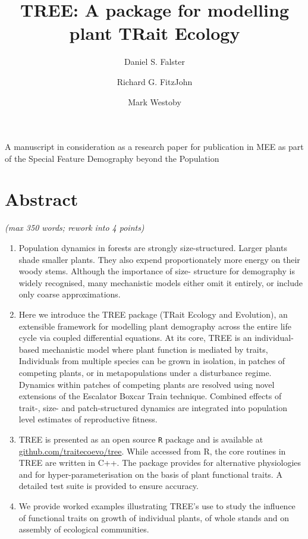\documentclass[]{article}
\title{TREE: A package for modelling plant TRait Ecology}
\author[1]{Daniel S. Falster}
\author[1]{Richard G. FitzJohn}
\author[1]{Mark Westoby}
\affil[1]{Dept of Biological Sciences, Macquarie University, Sydney, NSW 2109, Australia}
\date{}
\begin{document}
\maketitle

A manuscript in consideration as a research paper for publication in MEE
as part of the Special Feature Demography beyond the Population

\listoftodos

\linenumbers

\section{Abstract}\label{abstract}

\emph{(max 350 words; rework into 4 points)}

\begin{enumerate}
\def\labelenumi{\arabic{enumi}.}
\itemsep1pt\parskip0pt
\item
  Population dynamics in forests are strongly size-structured. Larger
  plants shade smaller plants. They also expend proportionately more
  energy on their woody stems. Although the importance of size-
  structure for demography is widely recognised, many mechanistic models
  either omit it entirely, or include only coarse approximations.
\item
  Here we introduce the TREE package (TRait Ecology and Evolution), an
  extensible framework for modelling plant demography across the entire
  life cycle via coupled differential equations. At its core, TREE is an
  individual-based mechanistic model where plant function is mediated by
  traits, Individuals from multiple species can be grown in isolation,
  in patches of competing plants, or in metapopulations under a
  disturbance regime. Dynamics within patches of competing plants are
  resolved using novel extensions of the Escalator Boxcar Train
  technique. Combined effects of trait-, size- and patch-structured
  dynamics are integrated into population level estimates of
  reproductive fitness.
\item
  TREE is presented as an open source \texttt{R} package and is
  available at
  \href{https://github.com/traitecoevo/tree}{github.com/traitecoevo/tree}.
  While accessed from R, the core routines in TREE are written in C++.
  The package provides for alternative physiologies and for
  hyper-parameterisation on the basis of plant functional traits. A
  detailed test suite is provided to ensure accuracy.
\item
  We provide worked examples illustrating TREE's use to study the
  influence of functional traits on growth of individual plants, of
  whole stands and on assembly of ecological communities.
\end{enumerate}
\end{document}
